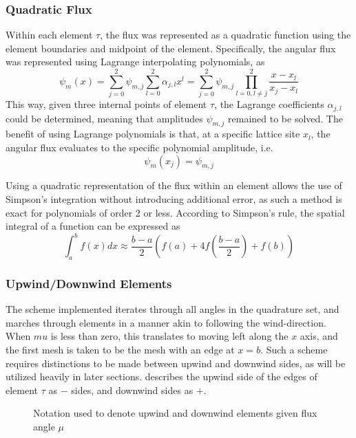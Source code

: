 \documentclass{article}
\begin{document}
\subsubsection{Quadratic Flux}
Within each element $\tau$, the flux was represented as a quadratic function using the element boundaries and 
midpoint of the element.
Specifically, the angular flux was represented using Lagrange interpolating polynomials, as
\begin{equation}
    \label{eq:fluxPoly}
    \psi_m(x) = \sum_{j=0}^2\psi_{m,j}\sum_{l=0}^2\alpha_{j,l}x^l
    = \sum_{j=0}^2\psi_{m,j}\prod_{l=0,l\neq j}^2\frac{x-x_l}{x_j-x_l}
\end{equation}
This way, given three internal points of element $\tau$, the Lagrange coefficients
$\alpha_{j,l}$ could be determined, meaning that amplitudes $\psi_{m,j}$ remained to
be solved.
The benefit of using Lagrange polynomials is that, at a specific lattice site $x_l$, the 
angular flux evaluates to the specific polynomial amplitude, i.e.
\begin{equation}
    \psi_m(x_j) = \psi_{m,j}
\end{equation}

Using a quadratic representation of the flux within an element allows the use of Simpson's
integration without introducing additional error, as such a method is exact for polynomials
of order 2 or less.
According to Simpson's rule, the spatial integral of a function can be expressed as
\begin{equation}
    \label{eq:simpsInt}
    \int_a^bf(x)dx \approx \frac{b-a}{2}\left(f(a) + 4f\left(\frac{b-a}{2}\right) + f(b)\right)
\end{equation}

\subsubsection{Upwind/Downwind Elements}
The scheme implemented iterates through all angles in the quadrature set, and marches through
elements in a manner akin to following the wind-direction. When $mu$ is less than zero, this 
translates to moving left along the $x$ axis, and the first mesh is taken to be the mesh
with an edge at $x=b$. 
Such a scheme requires distinctions to be made between upwind and downwind sides, as will be utilized
heavily in later sections.  describes the upwind side of the edges of element $\tau$
as $-$ sides, and downwind sides as $+$.

\begin{figure}
    \centering
    \begin{tikzpicture}
        
    \end{tikzpicture}
    \caption{Notation used to denote upwind and downwind elements given flux angle $\mu$}
    \label{fig:upwDnw}
\end{figure}
\end{document}
